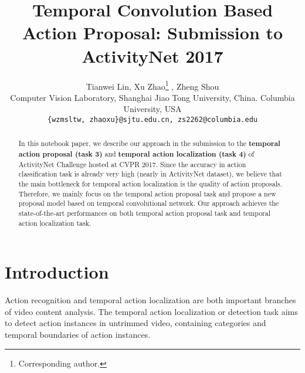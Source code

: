 \documentclass[10pt,twocolumn,letterpaper]{article}
\begin{document}
\title{Temporal Convolution Based Action Proposal: Submission to ActivityNet 2017}

\author{Tianwei Lin, Xu Zhao\thanks{Corresponding author.} , Zheng Shou\\
Computer Vision Laboratory, Shanghai Jiao Tong University, China. Columbia University, USA\\
{\tt\small \{wzmsltw,~zhaoxu\}@sjtu.edu.cn, zs2262@columbia.edu}
}




\maketitle


\begin{abstract}

In this notebook paper, we describe our approach in the submission to  the {\bf temporal action proposal (task 3)} and {\bf temporal action localization  (task 4)} of ActivityNet Challenge hosted at CVPR 2017. 
Since the accuracy in action classification task is already very high (nearly  in ActivityNet dataset), we believe that the main bottleneck for temporal action localization is the quality of action proposals. Therefore, we mainly focus on the temporal action proposal task and propose a new proposal model based on temporal convolutional network. 
Our approach achieves the state-of-the-art performances on both temporal action proposal task and temporal action localization task.

\end{abstract}


\section{Introduction}

Action recognition and temporal action localization are both important branches of video content analysis. The temporal action localization or detection task aims to detect action instances in untrimmed video, containing categories and temporal boundaries of action instances. 
\end{document}
